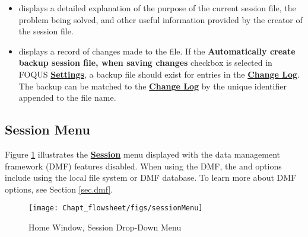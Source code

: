 \begin{enumerate}
\begin{itemize}
		\item {} displays a detailed explanation of the purpose of the current session file, the problem being solved, and other useful information provided by the creator of the session file.
		\item {} displays a record of changes made to the file. If the \textbf{\textbf{Automatically create backup session file, when saving changes}} checkbox is selected in FOQUS \textbf{\underline{Settings}}, a backup file should exist for entries in the \underline{\textbf{Change Log}}. The backup can be matched to the \underline{\textbf{Change Log}} by the unique identifier appended to the file name.
	\end{itemize}
\end{enumerate}

\subsection{Session Menu}
\label{session-menu}

Figure \ref{fig.session.menu} illustrates the \textbf{\underline{Session}} menu displayed with the data management framework (DMF) features disabled. When using the DMF, the  and  options include using the local file system or DMF database. To learn more about DMF options, see Section \ref{sec.dmf}.
\begin{figure}[H]
	\begin{center}
		\texttt{[image: Chapt\_flowsheet/figs/sessionMenu]}
		\caption{Home Window, Session Drop-Down Menu}
		\label{fig.session.menu}
	\end{center}
\end{figure}

